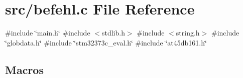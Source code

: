 \section{src/befehl.c File Reference}
\label{befehl_8c}
{\ttfamily \#include \char`\"{}main.\+h\char`\"{}}\newline
{\ttfamily \#include $<$stdlib.\+h$>$}\newline
{\ttfamily \#include $<$string.\+h$>$}\newline
{\ttfamily \#include \char`\"{}globdata.\+h\char`\"{}}\newline
{\ttfamily \#include \char`\"{}stm32373c\+\_\+eval.\+h\char`\"{}}\newline
{\ttfamily \#include \char`\"{}at45db161.\+h\char`\"{}}\newline
\subsection*{Macros}
